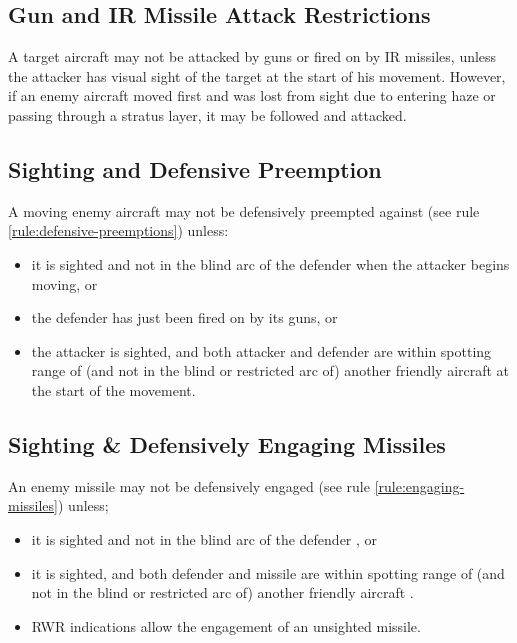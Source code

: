 \subsection{Gun and IR Missile Attack Restrictions} A target aircraft may not be attacked by guns or fired on by IR missiles, unless the attacker has visual sight of the target at the start of his movement. However, if an enemy aircraft moved first and was lost from sight due to entering haze or passing through a stratus layer, it may be followed and attacked.

\subsection{Sighting and Defensive Preemption} A moving enemy aircraft may not be defensively preempted against (see rule \ref{rule:defensive-preemptions}) unless:

\begin{itemize}
    \item it is sighted and not in the blind arc of the defender when the attacker begins moving, or
    \item the defender has just been fired on by its guns, or
    \item the attacker is sighted, and both attacker and defender are within spotting range of (and not in the blind or restricted arc of) another friendly aircraft at the start of the  movement.
\end{itemize}


\subsection{Sighting \& Defensively Engaging Missiles} An enemy missile may not be defensively engaged (see rule \ref{rule:engaging-missiles}) unless;

\begin{itemize}
    \item it is sighted and not in the blind arc of the defender , or
    \item it is sighted, and both defender and missile are within spotting range of (and not in the blind or restricted arc of) another friendly aircraft .
    \item RWR indications allow the engagement of an unsighted missile.
\end{itemize}

